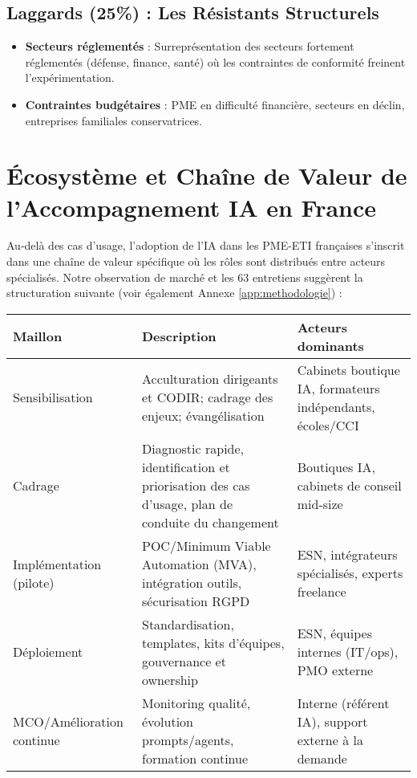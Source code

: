 \subsection{Laggards (25\%) : Les Résistants Structurels}

\begin{itemize}
    \item \textbf{Secteurs réglementés} : Surreprésentation des secteurs fortement réglementés (défense, finance, santé) où les contraintes de conformité freinent l'expérimentation.
    \item \textbf{Contraintes budgétaires} : PME en difficulté financière, secteurs en déclin, entreprises familiales conservatrices.
\end{itemize}

\section{Écosystème et Chaîne de Valeur de l'Accompagnement IA en France}
\label{sec:value_chain}
Au-delà des cas d'usage, l'adoption de l'IA dans les PME-ETI françaises s'inscrit dans une chaîne de valeur spécifique où les rôles sont distribués entre acteurs spécialisés. Notre observation de marché et les 63 entretiens suggèrent la structuration suivante (voir également Annexe \ref{app:methodologie}) :

\begin{longtable}{@{}p{3.5cm}p{6.5cm}p{5cm}@{}}
\toprule
\textbf{Maillon} & \textbf{Description} & \textbf{Acteurs dominants} \\
\midrule
Sensibilisation & Acculturation dirigeants et CODIR; cadrage des enjeux; évangélisation & Cabinets boutique IA, formateurs indépendants, écoles/CCI \\
Cadrage & Diagnostic rapide, identification et priorisation des cas d'usage, plan de conduite du changement & Boutiques IA, cabinets de conseil mid-size \\
Implémentation (pilote) & POC/Minimum Viable Automation (MVA), intégration outils, sécurisation RGPD & ESN, intégrateurs spécialisés, experts freelance \\
Déploiement & Standardisation, templates, kits d'équipes, gouvernance et ownership & ESN, équipes internes (IT/ops), PMO externe \\
MCO/Amélioration continue & Monitoring qualité, évolution prompts/agents, formation continue & Interne (référent IA), support externe à la demande \\
\bottomrule
\end{longtable}

